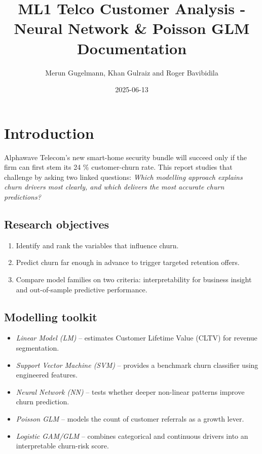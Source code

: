 \documentclass[
]{article}
\title{ML1 Telco Customer Analysis - Neural Network \& Poisson GLM
Documentation}
\author{Merun Gugelmann, Khan Gulraiz and Roger Bavibidila}
\date{2025-06-13}
\providecommand{\tightlist}{%
  \setlength{\itemsep}{0pt}\setlength{\parskip}{0pt}}
\begin{document}
\maketitle

{
\setcounter{tocdepth}{3}
\tableofcontents
}
\hypertarget{introduction}{%
\section{Introduction}\label{introduction}}

Alphawave Telecom's new smart-home security bundle will succeed only if
the firm can first stem its 24 \% customer-churn rate. This report
studies that challenge by asking two linked questions: \emph{Which
modelling approach explains churn drivers most clearly, and which
delivers the most accurate churn predictions?}

\hypertarget{research-objectives}{%
\subsection{Research objectives}\label{research-objectives}}

\begin{enumerate}
\def\labelenumi{\arabic{enumi}.}
\tightlist
\item
  Identify and rank the variables that influence churn.\\
\item
  Predict churn far enough in advance to trigger targeted retention
  offers.\\
\item
  Compare model families on two criteria: interpretability for business
  insight and out-of-sample predictive performance.
\end{enumerate}

\hypertarget{modelling-toolkit}{%
\subsection{Modelling toolkit}\label{modelling-toolkit}}

\begin{itemize}
\tightlist
\item
  \emph{Linear Model (LM)} -- estimates Customer Lifetime Value (CLTV)
  for revenue segmentation.\\
\item
  \emph{Support Vector Machine (SVM)} -- provides a benchmark churn
  classifier using engineered features.\\
\item
  \emph{Neural Network (NN)} -- tests whether deeper non-linear patterns
  improve churn prediction.\\
\item
  \emph{Poisson GLM} -- models the count of customer referrals as a
  growth lever.\\
\item
  \emph{Logistic GAM/GLM} -- combines categorical and continuous drivers
  into an interpretable churn-risk score.
\end{itemize}
\end{document}

